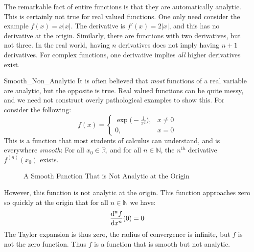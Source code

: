     The remarkable fact of entire functions is that they are automatically
    analytic. This is certainly not true for real valued functions. One
    only need consider the example $f(x)=x|x|$. The derivative is
    $f'(x)=2|x|$, and this has no derivative at the
    origin. Similarly, there are functions with two derivatives,
    but not three. In the real world, having $n$ derivatives does
    not imply having $n+1$ derivatives. For complex functions, one
    derivative implies \textit{all} higher derivatives exist.
    \begin{lexample}{}{Smooth_Non_Analytic}%
        It is often believed that \textit{most} functions of a
        real variable are analytic, but the opposite is true. Real valued
        functions can be quite messy, and we need not construct overly
        pathological examples to show this. For consider the following:
        \begin{equation}
            f(x)=
            \begin{cases}
                \exp\big(\!\minus\!\frac{1}{x^{2}}\big),&x\ne{0}\\
                0,&x=0
            \end{cases}
        \end{equation}
        This is a function that most students of calculus can understand,
        and is everywhere \textit{smooth}: For all $x_{0}\in\mathbb{R}$,
        and for all $n\in\mathbb{N}$, the $n^{th}$ derivative
        $f^{(n)}(x_{0})$ exists.
        \begin{figure}[H]
            \centering
            \captionsetup{type=figure}
            
            \caption{A Smooth Function That is Not Analytic at the Origin}
            \label{fig:Smooth_Not_Analytic_At_Origin}
        \end{figure}
        However, this function is not analytic at the origin. This
        function approaches zero so quickly at the origin that for all
        $n\in\mathbb{N}$ we have:
        \begin{equation}
            \frac{\mathop{}\!\mathrm{d}^{n}f}{\mathop{}\!\mathrm{d}{x}^{n}}(0)=0
        \end{equation}
        The Taylor expansion is thus zero, the radius of convergence
        is infinite, but $f$ is not the zero function. Thus $f$ is a
        function that is smooth but not analytic.
    \end{lexample}
